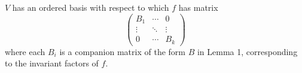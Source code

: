$V$ has an ordered basis with respect to which $f$ has matrix
$$\begin{pmatrix}
B_1 & \cdots & 0 \\
\vdots & \ddots & \vdots \\
0 & \cdots & B_k
\end{pmatrix}$$
where each $B_i$ is a companion matrix of the form $B$ in Lemma 1, corresponding to the invariant factors of $f$.
